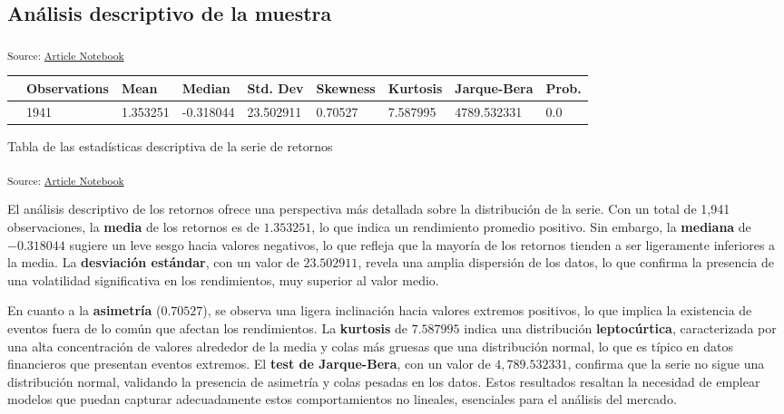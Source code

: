\documentclass[
  number,
  preprint,
  3p,
  onecolumn]{elsarticle}
\begin{document}
\subsection{Análisis descriptivo de la
muestra}\label{sec-estadistica-descriptiva}

\textsubscript{Source:
\href{https://iancont.github.io/fixed_income_garch/index-preview.html}{Article
Notebook}}

\begin{longtable}[]{@{}lllllllll@{}}
\toprule\noalign{}
& Observations & Mean & Median & Std. Dev & Skewness & Kurtosis &
Jarque-Bera & Prob. \\
\midrule\noalign{}
\endhead
\bottomrule\noalign{}
\endlastfoot
0 & 1941 & 1.353251 & -0.318044 & 23.502911 & 0.70527 & 7.587995 &
4789.532331 & 0.0 \\
\end{longtable}

Tabla de las estadísticas descriptiva de la serie de retornos

\textsubscript{Source:
\href{https://iancont.github.io/fixed_income_garch/index-preview.html}{Article
Notebook}}

El análisis descriptivo de los retornos ofrece una perspectiva más
detallada sobre la distribución de la serie. Con un total de 1,941
observaciones, la \textbf{media} de los retornos es de \(1.353251\), lo
que indica un rendimiento promedio positivo. Sin embargo, la
\textbf{mediana} de \(-0.318044\) sugiere un leve sesgo hacia valores
negativos, lo que refleja que la mayoría de los retornos tienden a ser
ligeramente inferiores a la media. La \textbf{desviación estándar}, con
un valor de \(23.502911\), revela una amplia dispersión de los datos, lo
que confirma la presencia de una volatilidad significativa en los
rendimientos, muy superior al valor medio.

En cuanto a la \textbf{asimetría} (\(0.70527\)), se observa una ligera
inclinación hacia valores extremos positivos, lo que implica la
existencia de eventos fuera de lo común que afectan los rendimientos. La
\textbf{kurtosis} de \(7.587995\) indica una distribución
\textbf{leptocúrtica}, caracterizada por una alta concentración de
valores alrededor de la media y colas más gruesas que una distribución
normal, lo que es típico en datos financieros que presentan eventos
extremos. El \textbf{test de Jarque-Bera}, con un valor de
\(4,789.532331\), confirma que la serie no sigue una distribución
normal, validando la presencia de asimetría y colas pesadas en los
datos. Estos resultados resaltan la necesidad de emplear modelos que
puedan capturar adecuadamente estos comportamientos no lineales,
esenciales para el análisis del mercado.
\end{document}
